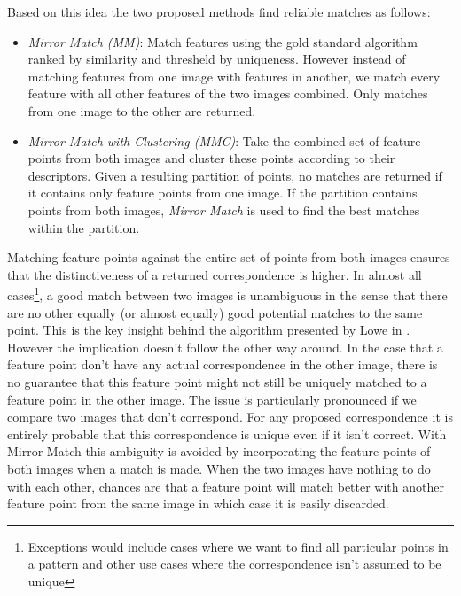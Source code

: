 \documentclass{article}
\begin{document}
Based on this idea the two proposed methods find reliable matches as 
follows:
\begin{itemize}
\item{\emph{Mirror Match (MM)}: Match features using the gold standard 
algorithm\cite[p. 114]{multipleView} ranked by similarity and thresheld 
by uniqueness\cite{lowe2004sift}. However instead of matching features 
from one image with features in another, we match every feature with all 
other features of the two images combined. Only matches from one image 
to the other are returned.}
\item{\emph{Mirror Match with Clustering (MMC)}: Take the combined set 
of feature points from both images and cluster these points according to 
their descriptors. Given a resulting partition of points, no matches are 
returned if it contains only feature points from one image. If the 
partition contains points from both images, \emph{Mirror Match} is used 
to find the best matches within the partition.}
\end{itemize}

Matching feature points against the entire set of points from both 
images ensures that the distinctiveness of a returned correspondence is 
higher. In almost all cases\footnote{Exceptions would include cases 
where we want to find all particular points in a pattern and other use 
cases where the correspondence isn't assumed to be unique}, a good match 
between two images is unambiguous in the sense that there are no other 
equally (or almost equally) good potential matches to the same point.  
This is the key insight behind the algorithm presented by Lowe in 
\cite{lowe2004sift}. However the implication doesn't follow the other 
way around. In the case that a feature point don't have any actual 
correspondence in the other image, there is no guarantee that this 
feature point might not still be uniquely matched to a feature point in 
the other image. The issue is particularly pronounced if we compare two 
images that don't correspond. For any proposed correspondence it is 
entirely probable that this correspondence is unique even if it isn't 
correct. With Mirror Match this ambiguity is avoided by incorporating 
the feature points of both images when a match is made. When the two 
images have nothing to do with each other, chances are that a feature 
point will match better with another feature point from the same image 
in which case it is easily discarded.
\end{document}
